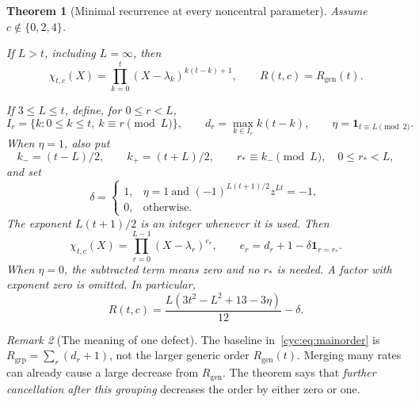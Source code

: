 \documentclass[11pt,a4paper]{article}
\numberwithin{equation}{section}
\newtheorem{theorem}{Theorem}[section]
\theoremstyle{definition}
\theoremstyle{remark}
\newtheorem{remark}[theorem]{Remark}
\newcommand{\Rgen}{R_{\mathrm{gen}}}
\newcommand{\Rgrp}{R_{\mathrm{grp}}}
\newcommand{\ind}{\mathbf 1}
\begin{document}
\begin{theorem}[Minimal recurrence at every noncentral parameter]
\label{cyc:thm:main}
Assume $c\notin\{0,2,4\}$.

If $L>t$, including $L=\infty$, then
\begin{equation}\label{cyc:eq:nonreschar}
 \chi_{t,c}(X)=\prod_{k=0}^{t}(X-\lambda_k)^{k(t-k)+1},
 \qquad R(t,c)=\Rgen(t).
\end{equation}

If $3\le L\le t$, define, for $0\le r<L$,
\begin{equation}\label{cyc:eq:resclasses}
 I_r=\{k:0\le k\le t,\ k\equiv r\pmod L\},\qquad
 d_r=\max_{k\in I_r}k(t-k),\qquad \eta=\ind_{t\equiv L\pmod2}.
\end{equation}
When $\eta=1$, also put
\begin{equation}\label{cyc:eq:tieparams}
 k_-=(t-L)/2,\qquad k_+=(t+L)/2,\qquad r_*\equiv k_-\pmod L,
 \quad 0\le r_*<L,
\end{equation}
and set
\begin{equation}\label{cyc:eq:defect}
 \delta=
 \begin{cases}
  1,&\eta=1\ \text{and }(-1)^{L(t+1)/2}z^{Lt}=-1,\\
  0,&\text{otherwise}.
 \end{cases}
\end{equation}
The exponent $L(t+1)/2$ is an integer whenever it is used.  Then
\begin{equation}\label{cyc:eq:mainchar}
 \boxed{\quad
 \chi_{t,c}(X)=\prod_{r=0}^{L-1}(X-\lambda_r)^{e_r},\qquad
 e_r=d_r+1-\delta\ind_{r=r_*}.
 \quad}
\end{equation}
When $\eta=0$, the subtracted term means zero and no $r_*$ is needed.
A factor with exponent zero is omitted.  In particular,
\begin{equation}\label{cyc:eq:mainorder}
 \boxed{\qquad
 R(t,c)=\frac{L(3t^2-L^2+13-3\eta)}{12}-\delta.
 \qquad}
\end{equation}
\end{theorem}

\begin{remark}[The meaning of one defect]\label{cyc:rem:onedefect}
The baseline in~\eqref{cyc:eq:mainorder} is
$\Rgrp=\sum_r(d_r+1)$, not the larger generic order
$\Rgen(t)$.  Merging many rates can already cause a large decrease
from $\Rgen$.  The theorem says that \emph{further cancellation after
this grouping} decreases the order by either zero or one.
\end{remark}
\end{document}

